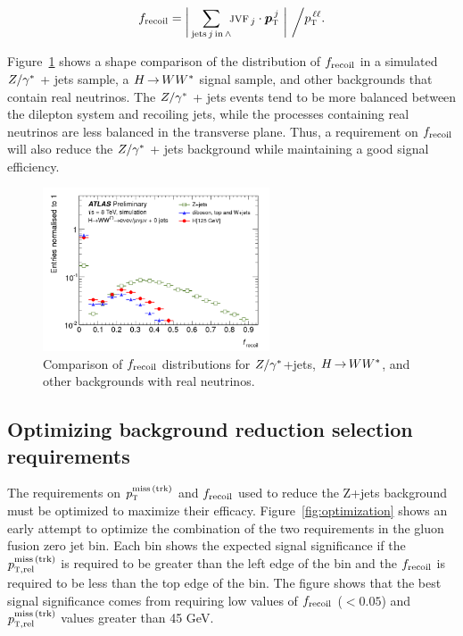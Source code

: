 \begin{equation}
\frecoil = \raisebox{-3pt}{\bigg|} \sum_{{\rm jets\,}j{\rm\,in\,}\wedge}
           \no\jvf_{\,j}\cdot\vpTjet
           ~\raisebox{-3pt}{\bigg|}
           ~\raisebox{-3pt}{\bigg/} \pTll.
\label{eqn:frecoil}
\end{equation}

Figure~\ref{fig:frecoil} shows a shape comparison of the distribution of $f_{\rm recoil}$ in a simulated $Z/\gamma^{\ast}$ + jets sample, a $H{\,{\rightarrow}\,}WW^\ast$ signal sample, and other backgrounds that contain real neutrinos. The $Z/\gamma^{\ast}$ + jets events tend to be more balanced between the dilepton system and recoiling jets, while the processes containing real neutrinos are less balanced in the transverse plane. Thus, a requirement on $f_{\rm recoil}$ will also reduce the $Z/\gamma^{\ast}$ + jets background while maintaining a good signal efficiency. 

\begin{figure}[h!]
  \centering
  \captionsetup{justification=centering}

  \includegraphics[width=0.6\textwidth]{figures/frecoil}
  \caption{Comparison of $f_{\rm recoil}$ distributions for $Z/\gamma^{\ast}$+jets, $H{\,{\rightarrow}\,}WW^\ast$, and other backgrounds with real neutrinos.}
  \label{fig:frecoil}
\end{figure}

\subsection{Optimizing background reduction selection requirements}

The requirements on $p_{\textrm{\footnotesize\sc t}}^{\rm miss\,(trk)}$ and $f_{\rm recoil}$ used to reduce the Z+jets background must be optimized to maximize their efficacy. Figure~\ref{fig:optimization} shows an early attempt to optimize the combination of the two requirements in the gluon fusion zero jet bin. Each bin shows the expected signal significance if the $p_{{\textrm{\footnotesize\sc t}},{\rm rel}}^{\rm miss\,(trk)}$ is required to be greater than the left edge of the bin and the $f_{\rm recoil}$ is required to be less than the top edge of the bin. The figure shows that the best signal significance comes from requiring low values of $f_{\rm recoil}$ ($< 0.05$) and $p_{{\textrm{\footnotesize\sc t}},{\rm rel}}^{\rm miss\,(trk)}$  values greater than 45 GeV. 

